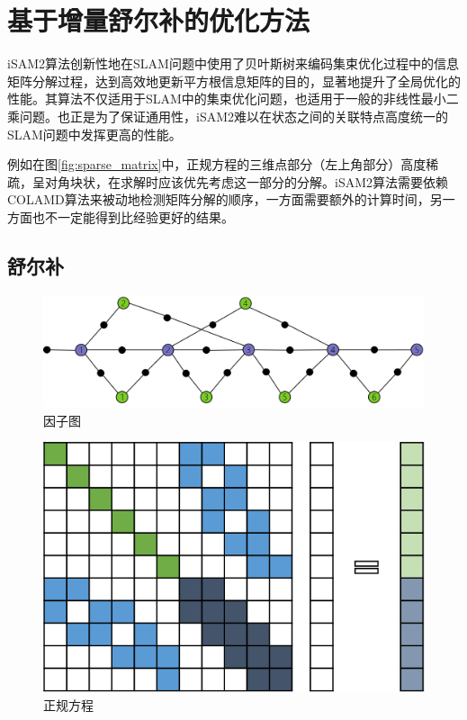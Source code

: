 \section{基于增量舒尔补的优化方法}

iSAM2算法\cite{kaess2008isam,kaess2012isam2}创新性地在SLAM问题中使用了贝叶斯树来编码集束优化过程中的信息矩阵分解过程，达到高效地更新平方根信息矩阵的目的，显著地提升了全局优化的性能。其算法不仅适用于SLAM中的集束优化问题，也适用于一般的非线性最小二乘问题。也正是为了保证通用性，iSAM2难以在状态之间的关联特点高度统一的SLAM问题中发挥更高的性能。

例如在图\ref{fig:sparse_matrix}中，正规方程的三维点部分（左上角部分）高度稀疏，呈对角块状，在求解时应该优先考虑这一部分的分解。iSAM2算法需要依赖COLAMD\citep{davis2004algorithm}算法来被动地检测矩阵分解的顺序，一方面需要额外的计算时间，另一方面也不一定能得到比经验更好的结果。

\subsection{舒尔补}

\begin{figure}[htbp]
    \centering
    \includegraphics[width=\textwidth]{./figs/fg.png}
    \caption{因子图}
\end{figure}

\begin{figure}[htbp]
    \centering
    \includegraphics{./figs/normal_eq.png}
    \caption{正规方程}
\end{figure}

